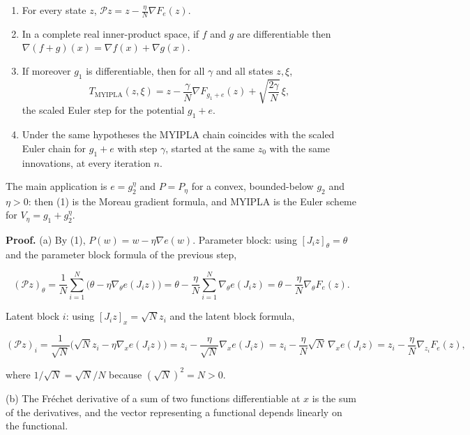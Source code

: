 \documentclass[11pt,a4paper]{article}
\begin{document}
\begin{enumerate}


\item For every state \(z\), \(\mathcal Pz=z-\frac\eta N\nabla F_e(z)\).

\item In a complete real inner-product space, if \(f\) and \(g\) are differentiable then \(\nabla(f+g)(x)=\nabla f(x)+\nabla g(x)\).

\item If moreover \(g_1\) is differentiable, then for all \(\gamma\) and all states \(z,\xi\),
\[T_{\mathrm{MYIPLA}}(z,\xi)=z-\frac\gamma N\nabla F_{g_1+e}(z)+\sqrt{\frac{2\gamma}N}\,\xi,\]
the scaled Euler step for the potential \(g_1+e\).

\item Under the same hypotheses the MYIPLA chain coincides with the scaled Euler chain for \(g_1+e\) with step \(\gamma\), started at the same \(z_0\) with the same innovations, at every iteration \(n\).

\end{enumerate}



The main application is \(e=g_2^\eta\) and \(P=P_\eta\) for a convex, bounded-below \(g_2\) and \(\eta>0\): then (1) is the Moreau gradient formula, and MYIPLA is the Euler scheme for \(V_\eta=g_1+g_2^\eta\).




\textbf{Proof.} (a) By (1), \(P(w)=w-\eta\nabla e(w)\). Parameter block: using \([J_iz]_\theta=\theta\) and the parameter block formula of the previous step,


\[(\mathcal Pz)_\theta=\frac1N\sum_{i=1}^N\bigl(\theta-\eta\nabla_\theta e(J_iz)\bigr)=\theta-\frac\eta N\sum_{i=1}^N\nabla_\theta e(J_iz)=\theta-\frac\eta N\nabla_\theta F_e(z).\]


Latent block \(i\): using \([J_iz]_x=\sqrt Nz_i\) and the latent block formula,


\[(\mathcal Pz)_i=\frac1{\sqrt N}\bigl(\sqrt Nz_i-\eta\nabla_xe(J_iz)\bigr)=z_i-\frac{\eta}{\sqrt N}\nabla_xe(J_iz)=z_i-\frac\eta N\sqrt N\,\nabla_xe(J_iz)=z_i-\frac\eta N\nabla_{z_i}F_e(z),\]


where \(1/\sqrt N=\sqrt N/N\) because \((\sqrt N)^2=N>0\).




(b) The Fréchet derivative of a sum of two functions differentiable at \(x\) is the sum of the derivatives, and the vector representing a functional depends linearly on the functional.
\end{document}
